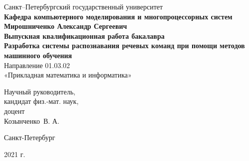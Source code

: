 \begin{titlepage}
\begin{center}
Санкт--Петербургский государственный университет \\
\textbf{Кафедра компьютерного моделирования и многопроцессорных систем}
\vspace{55mm} \\
\textbf{\large Мирошниченко Александр Сергеевич} \\[10mm]
\textbf{\large Выпускная квалификационная работа бакалавра} \\[10mm]
\textbf{\large Разработка системы распознавания речевых команд при помощи методов машинного обучения} \\
Направление 01.03.02 \\
«Прикладная математика и информатика»\\[30mm]
\begin{flushright}
{Научный руководитель,} \\
кандидат физ.-мат. наук, \\доцент \\Козынченко~В. А. 
\end{flushright}
\vfill 
{Санкт-Петербург}
\par{2021 г.}
\end{center}
\end{titlepage}
\addtocounter{page}{1}